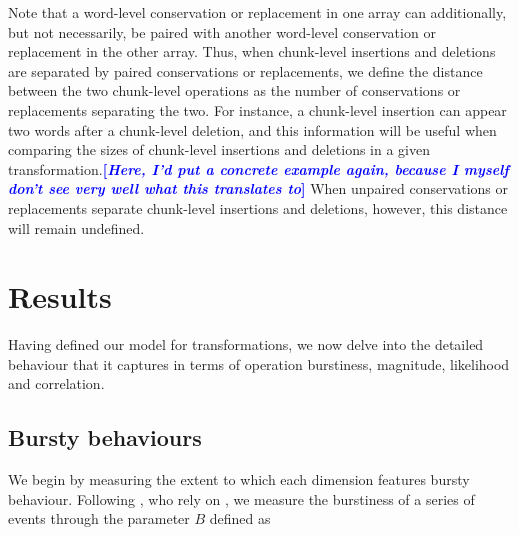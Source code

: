 \documentclass[a4paper,fleqn]{cas-dc}
\newcommand{\tb}[1]{\textcolor{blue}{#1}}
\newcommand{\rk}[1]{\tb{{\footnotesize {\bf[\emph{#1}]}}}}
\begin{document}
Note that a word-level conservation or replacement in one array can
additionally, but not necessarily, be paired with another word-level
conservation or replacement in the other array. Thus, when chunk-level
insertions and deletions are separated by paired conservations or
replacements, we define the distance between the two chunk-level
operations as the number of conservations or replacements separating the
two. For instance, a chunk-level insertion can appear two words after a
chunk-level deletion, and this information will be useful when comparing
the sizes of chunk-level insertions and deletions in a given
transformation.\rk{Here, I'd put a concrete example again, because I myself don't see very well what this translates to}  When unpaired conservations or replacements separate
chunk-level insertions and deletions, however, this distance will remain
undefined.


\section{Results}\label{sec:gistr-results-inner}

Having defined our model for transformations, we now delve into the
detailed behaviour that it captures in terms of operation burstiness, magnitude, likelihood and correlation.

\subsection{Bursty behaviours}\label{bursty-behaviours}

We begin by measuring the extent to which each dimension features bursty
behaviour. Following \citet{jo_circadian_2012}, who rely on
\citet{goh_burstiness_2008}, we measure the burstiness of a series of
events through the parameter \(B\) defined as
\end{document}
